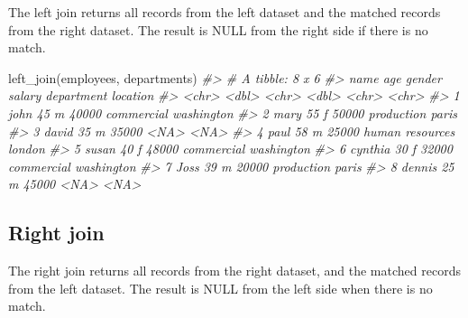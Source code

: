 \documentclass[
]{book}
\newenvironment{Shaded}{\begin{snugshade}}{\end{snugshade}}
\newcommand{\CommentTok}[1]{\textcolor[rgb]{0.56,0.35,0.01}{\textit{#1}}}
\newcommand{\FunctionTok}[1]{\textcolor[rgb]{0.00,0.00,0.00}{#1}}
\newcommand{\NormalTok}[1]{#1}
\begin{document}
The left join returns all records from the left dataset and the matched records from the right dataset. The result is NULL from the right side if there is no match.

\begin{Shaded}
\begin{Highlighting}[]
\FunctionTok{left\_join}\NormalTok{(employees, departments)}
\CommentTok{\#\textgreater{} \# A tibble: 8 x 6}
\CommentTok{\#\textgreater{}   name      age gender salary department      location  }
\CommentTok{\#\textgreater{}   \textless{}chr\textgreater{}   \textless{}dbl\textgreater{} \textless{}chr\textgreater{}   \textless{}dbl\textgreater{} \textless{}chr\textgreater{}           \textless{}chr\textgreater{}     }
\CommentTok{\#\textgreater{} 1 john       45 m       40000 commercial      washington}
\CommentTok{\#\textgreater{} 2 mary       55 f       50000 production      paris     }
\CommentTok{\#\textgreater{} 3 david      35 m       35000 \textless{}NA\textgreater{}            \textless{}NA\textgreater{}      }
\CommentTok{\#\textgreater{} 4 paul       58 m       25000 human resources london    }
\CommentTok{\#\textgreater{} 5 susan      40 f       48000 commercial      washington}
\CommentTok{\#\textgreater{} 6 cynthia    30 f       32000 commercial      washington}
\CommentTok{\#\textgreater{} 7 Joss       39 m       20000 production      paris     }
\CommentTok{\#\textgreater{} 8 dennis     25 m       45000 \textless{}NA\textgreater{}            \textless{}NA\textgreater{}}
\end{Highlighting}
\end{Shaded}

\hypertarget{right-join-1}{%
\subsection{Right join}\label{right-join-1}}

The right join returns all records from the right dataset, and the matched records from the left dataset. The result is NULL from the left side when there is no match.
\end{document}
